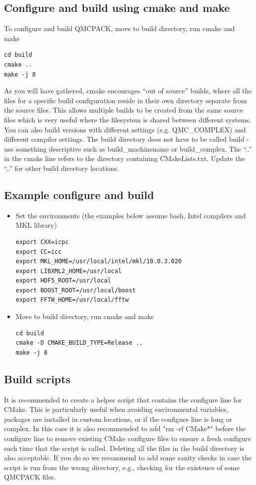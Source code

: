\subsection{Configure and build using cmake and make}
To configure and build QMCPACK, move to build directory, run cmake and make
\begin{verbatim}
cd build
cmake ..
make -j 8
\end{verbatim}

As you will have gathered, cmake encourages ``out of source'' builds,
where all the files for a specific build configuration reside in their
own directory separate from the source files. This allows multiple
builds to be created from the same source files which is very useful
where the filesystem is shared between different systems. You can also
build versions with different settings (e.g. QMC\_COMPLEX) and
different compiler settings. The build directory does not have to be
called build - use something descriptive such as build\_machinename or
build\_complex. The ``..'' in the cmake line refers to the directory
containing CMakeLists.txt. Update the ``..'' for other build
directory locations.

\subsection{Example configure and build}
\begin{itemize}
\item Set the environments (the examples below assume bash, Intel compilers and MKL library)
\begin{verbatim}
export CXX=icpc
export CC=icc
export MKL_HOME=/usr/local/intel/mkl/10.0.3.020
export LIBXML2_HOME=/usr/local
export HDF5_ROOT=/usr/local
export BOOST_ROOT=/usr/local/boost
export FFTW_HOME=/usr/local/fftw
\end{verbatim}

\item Move to build directory, run cmake and make
\begin{verbatim}
cd build
cmake -D CMAKE_BUILD_TYPE=Release ..
make -j 8
\end{verbatim}
\end{itemize}

\subsection{Build scripts}
It is recommended to create a helper script that contains the
configure line for CMake.  This is particularly useful when avoiding
environmental variables, packages are installed in custom locations,
or if the configure line is long or complex.  In this case it is also
recommended to add "rm -rf CMake*" before the configure line to remove
existing CMake configure files to ensure a fresh configure each time
that the script is called. Deleting all the files in the build
directory is also acceptable. If you do so we recommend to add some sanity
checks in case the script is run from the wrong directory, e.g.,
checking for the existence of some QMCPACK files.

